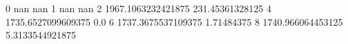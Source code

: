 0 nan nan
1 nan nan
2 1967.1063232421875 231.45361328125
4 1735.6527099609375 0.0
6 1737.3675537109375 1.71484375
8 1740.966064453125 5.3133544921875
